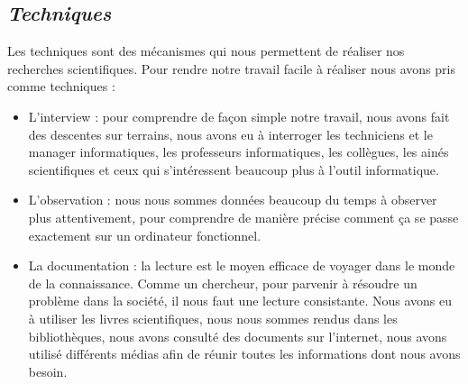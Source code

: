         \subsection[Techniques]{\textit{Techniques}}
        Les techniques sont des mécanismes qui nous permettent de réaliser nos recherches
        scientifiques. Pour rendre notre travail facile à réaliser nous avons pris comme techniques : 
        \par
        \begin{itemize}
            \setlength{\itemsep}{0pt}
            \item [\ding{226}] L’interview : pour comprendre de façon simple notre travail, nous avons fait des
            descentes sur terrains, nous avons eu à interroger les techniciens et le manager
            informatiques, les professeurs informatiques, les collègues, les ainés scientifiques
            et ceux qui s’intéressent beaucoup plus à l’outil informatique.
            \item [\ding{226}] L’observation : nous nous sommes données beaucoup du temps à observer plus
            attentivement, pour comprendre de manière précise comment ça se passe exactement sur un ordinateur fonctionnel.
            \item [\ding{226}] La documentation : la lecture est le moyen efficace de voyager dans le monde
            de la connaissance. Comme un chercheur, pour parvenir à résoudre un problème
            dans la société, il nous faut une lecture consistante. Nous avons eu à utiliser les
            livres scientifiques, nous nous sommes rendus dans les bibliothèques, nous avons
            consulté des documents sur l’internet, nous avons utilisé différents médias afin de
            réunir toutes les informations dont nous avons besoin.
        \end{itemize}
